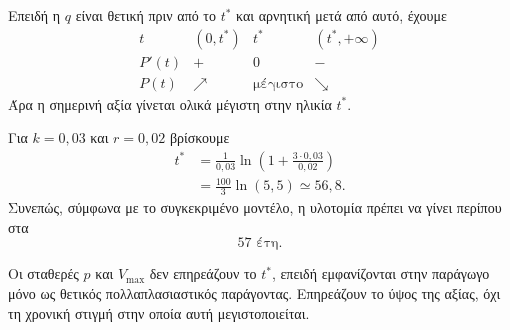 \begin{alist}
        Επειδή η $q$ είναι θετική πριν από το $t^*$ και αρνητική μετά
        από αυτό, έχουμε
        \[
        \begin{array}{c|ccc}
          t & (0,t^*) & t^* & (t^*,+\infty)\\ \hline
          P'(t) & + & 0 & -\\
          P(t) & \nearrow & \text{μέγιστο} & \searrow
        \end{array}
        \]
        Άρα η σημερινή αξία γίνεται ολικά μέγιστη στην ηλικία $t^*$.

  \item Για $k=0{,}03$ και $r=0{,}02$ βρίσκουμε
        \begin{align*}
          t^*
          &=\frac{1}{0{,}03}
            \ln\left(1+\frac{3\cdot0{,}03}{0{,}02}\right)\\
          &=\frac{100}{3}\ln(5{,}5)
          \simeq56{,}8.
        \end{align*}
        Συνεπώς, σύμφωνα με το συγκεκριμένο μοντέλο, η υλοτομία πρέπει
        να γίνει περίπου στα
        \[
          {57\text{ έτη}}.
        \]

        Οι σταθερές $p$ και $V_{\max}$ δεν επηρεάζουν το $t^*$, επειδή
        εμφανίζονται στην παράγωγο μόνο ως θετικός πολλαπλασιαστικός
        παράγοντας. Επηρεάζουν το ύψος της αξίας, όχι τη χρονική στιγμή
        στην οποία αυτή μεγιστοποιείται.
\end{alist}
